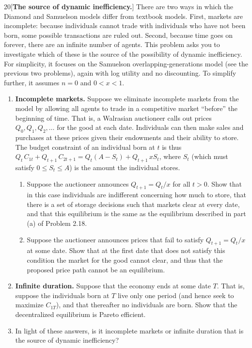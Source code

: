 \begin{problem}{20}[\textbf{The source of dynamic inefficiency.}]
There are two ways in which the Diamond and Samuelson models differ from textbook models. First, markets are incomplete: because individuals cannot trade with individuals who have not been born, some possible transactions are ruled out. Second, because time goes on forever, there are an infinite number of agents. This problem asks you to investigate which of these is the source of the possibility of dynamic inefficiency. For simplicity, it focuses on the Samuelson overlapping-generations model (see the previous two problems), again with log utility and no discounting. To simplify further, it assumes \(n=0\) and \(0<x<1\).
\begin{enumerate}[label=(\alph*)]
    \item \textbf{Incomplete markets.} Suppose we eliminate incomplete markets from the model by allowing all agents to trade in a competitive market ``before'' the beginning of time. That is, a Walrasian auctioneer calls out prices \(Q_0,Q_1,Q_2,\ldots\) for the good at each date. Individuals can then make sales and purchases at these prices given their endowments and their ability to store. The budget constraint of an individual born at \(t\) is thus \(Q_t\,C_{1t}+Q_{t+1}\,C_{2t+1}=Q_t\left(A-S_t\right)+Q_{t+1}\,xS_t\), where \(S_t\) (which must satisfy \(0\le S_t\le A\)) is the amount the individual stores.
    \begin{enumerate}[label=(\roman*)]
        \item Suppose the auctioneer announces \(Q_{t+1}=Q_t/x\) for all \(t>0\). Show that in this case individuals are indifferent concerning how much to store, that there is a set of storage decisions such that markets clear at every date, and that this equilibrium is the same as the equilibrium described in part (a) of Problem 2.18.
        \item Suppose the auctioneer announces prices that fail to satisfy \(Q_{t+1}=Q_t/x\) at some date. Show that at the first date that does not satisfy this condition the market for the good cannot clear, and thus that the proposed price path cannot be an equilibrium.
    \end{enumerate}
    \item \textbf{Infinite duration.} Suppose that the economy ends at some date \(T\). That is, suppose the individuals born at \(T\) live only one period (and hence seek to maximize \(C_{1T}\)), and that thereafter no individuals are born. Show that the decentralized equilibrium is Pareto efficient.
    \item In light of these answers, is it incomplete markets or infinite duration that is the source of dynamic inefficiency?
\end{enumerate}
\end{problem}

